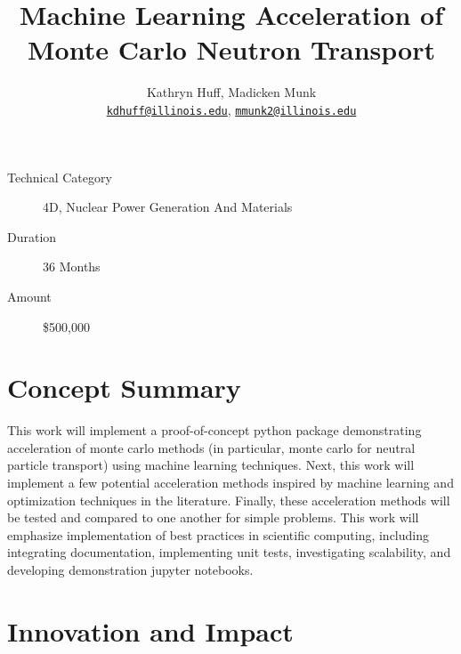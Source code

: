 \documentclass[letterpaper,12pt]{article}
\author{Kathryn Huff, Madicken Munk\\
        \href{mailto:kdhuff@illinois.edu}{\texttt{kdhuff@illinois.edu}},
        \href{mailto:mmunk2@illinois.edu}{\texttt{mmunk2@illinois.edu}}
}
\date{}
\title{Machine Learning Acceleration of Monte Carlo Neutron Transport}
\begin{document}
\maketitle

\thispagestyle{fancy}

\begin{description}
    \item[Technical Category] 4D, Nuclear Power Generation And Materials
    \item[Duration] 36 Months
    \item[Amount] \$500,000
\end{description}


\section{Concept Summary}


This work will implement a proof-of-concept python package demonstrating
acceleration of monte carlo methods (in particular, monte carlo for neutral
particle transport) using machine learning techniques. 
Next, this work will implement a few potential acceleration methods inspired by machine
learning and optimization techniques in the literature. 
Finally, these acceleration methods will be tested and compared to one another for simple
problems. This work will emphasize implementation of best practices in
scientific computing, including integrating documentation, implementing unit
tests, investigating scalability, and developing demonstration jupyter
notebooks. 

\section{Innovation and Impact}
\end{document}
